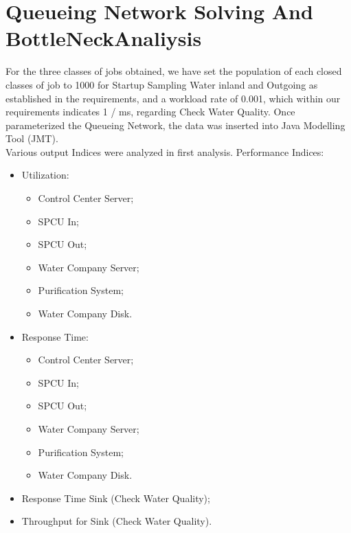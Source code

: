 \chapter{\textbf{Queueing Network Solving And BottleNeckAnaliysis}}


For the three classes of jobs obtained, we have set the population of each closed classes of job to 1000 for Startup Sampling Water inland and Outgoing as established in the requirements, and a workload rate of 0.001, which within our requirements indicates 1 / ms, regarding Check Water Quality.
Once parameterized the Queueing Network, the data was inserted into Java Modelling Tool (JMT).\\
Various output Indices were analyzed in first analysis. Performance Indices:
\begin{itemize}
\item Utilization:
	\begin{itemize}
		\item Control Center Server;
		\item SPCU In;
		\item SPCU Out;
		\item Water Company Server;
		\item Purification System;
		\item Water Company Disk.
	\end{itemize}
\item Response Time:
	\begin{itemize}
		\item Control Center Server;
		\item SPCU In;
		\item SPCU Out;
		\item Water Company Server;
		\item Purification System;
		\item Water Company Disk.
	\end{itemize}
\item Response Time Sink (Check Water Quality);
\item Throughput for Sink (Check Water Quality).
\end{itemize}

